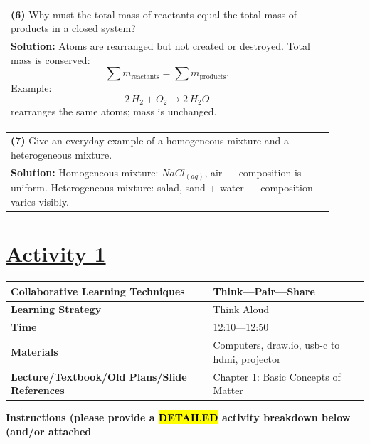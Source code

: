 \documentclass{article}
\begin{document}
\newpage
\begin{tabular}{|p{0.9\linewidth}|}
\hline
\textbf{(6)} Why must the total mass of reactants equal the total mass of products in a closed system? \\
\textbf{Solution:} Atoms are rearranged but not created or destroyed. Total mass is conserved: $$\sum m_{\text{reactants}} = \sum m_{\text{products}}.$$ Example: $$2\,H_2 + O_2 \rightarrow 2\,H_2O$$ rearranges the same atoms; mass is unchanged. \\ \hline
\end{tabular}
\newpage
\begin{tabular}{|p{0.9\linewidth}|}
\hline
\textbf{(7)} Give an everyday example of a homogeneous mixture and a heterogeneous mixture. \\
\textbf{Solution:} Homogeneous mixture: $NaCl_{(aq)}$, air — composition is uniform. Heterogeneous mixture: salad, sand + water — composition varies visibly. \\ \hline
\end{tabular}
\newpage
\noindent
\section*{\underline{Activity 1}}
\begin{tabular}{|p{4.2cm}|p{9.8cm}|}
\hline
\textbf{Collaborative Learning Techniques} & Think---Pair---Share \\
\hline
\textbf{Learning Strategy} & Think Aloud \\
\hline
\textbf{Time} & 12:10---12:50 \\
\hline
\textbf{Materials} & Computers, draw.io, usb-c to hdmi, projector \\
\hline
\textbf{Lecture/Textbook/Old Plans/Slide References} & Chapter 1: Basic Concepts of Matter \\
\hline
\end{tabular}

\vspace{0.5cm}

\noindent
{\large \textbf{Instructions (please provide a \hl{DETAILED} activity breakdown below (and/or attached}} \\
\end{document}
